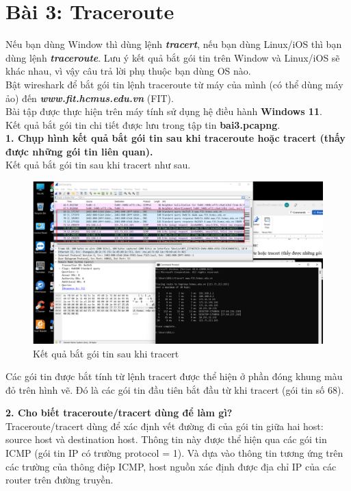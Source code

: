 \section{Bài 3: Traceroute}
Nếu bạn dùng Window thì dùng lệnh \textbf{\textit{tracert}}, nếu bạn dùng Linux/iOS thì bạn dùng lệnh \textbf{\textit{traceroute}}. Lưu ý kết quả bắt gói tin trên Window và Linux/iOS sẽ khác nhau, vì vậy câu trả lời phụ thuộc bạn dùng OS nào.\\
Bật wireshark để bắt gói tin lệnh traceroute từ máy của mình (có thể dùng máy ảo) đến \textbf{\textit{www.fit.hcmus.edu.vn}} (FIT). \\
Bài tập được thực hiện trên máy tính sử dụng hệ điều hành \textbf{Windows 11}.\\
Kết quả bắt gói tin chi tiết được lưu trong tập tin \textbf{bai3.pcapng}.\\

\textbf{1. Chụp hình kết quả bắt gói tin sau khi traceroute hoặc tracert (thấy được những gói tin liên quan).}\\
Kết quả bắt gói tin sau khi tracert như sau.
\begin{figure}[H]
\begin{center}
\includegraphics[scale=.8]{../figures/p3/p3_res1}
\end{center}
\caption{Kết quả bắt gói tin sau khi tracert}
\end{figure}
Các gói tin được bắt tính từ lệnh tracert được thể hiện ở phần đóng khung màu đỏ trên hình vẽ. Đó là các gói tin đầu tiên bắt đầu từ khi tracert (gói tin số 68).

\textbf{2. Cho biết traceroute/tracert dùng để làm gì?}\\
Traceroute/tracert dùng để xác định vết đường đi của gói tin giữa hai host: source host và destination host. 
Thông tin này được thể hiện qua các gói tin ICMP (gói tin IP có trường protocol = 1). Và dựa vào thông tin tương ứng trên các trường của thông điệp ICMP, host nguồn xác định được địa chỉ IP của các router trên đường truyền. \supercite{cn, slides}

